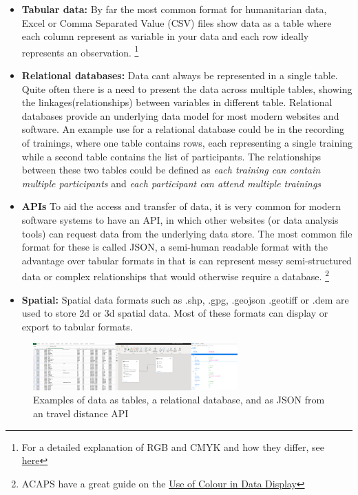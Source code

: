 \documentclass[
  a4paper,
  onecolumn,
  oneside]{book}
\begin{document}
\begin{itemize}
\item
  \textbf{Tabular data:} By far the most common format for humanitarian
  data, Excel or Comma Separated Value (CSV) files show data as a table
  where each column represent as variable in your data and each row
  ideally represents an observation. \footnote{For a detailed
    explanation of RGB and CMYK and how they differ, see
    \href{https://en.99designs.ch/blog/tips/correct-file-formats-rgb-and-cmyk/}{here}}
\item
  \textbf{Relational databases:} Data cant always be represented in a
  single table. Quite often there is a need to present the data across
  multiple tables, showing the linkages(relationships) between variables
  in different table. Relational databases provide an underlying data
  model for most modern websites and software. An example use for a
  relational database could be in the recording of trainings, where one
  table contains rows, each representing a single training while a
  second table contains the list of participants. The relationships
  between these two tables could be defined as \emph{each training can
  contain multiple participants} and \emph{each participant can attend
  multiple trainings}
\item
  \textbf{APIs} To aid the access and transfer of data, it is very
  common for modern software systems to have an API, in which other
  websites (or data analysis tools) can request data from the underlying
  data store. The most common file format for these is called JSON, a
  semi-human readable format with the advantage over tabular formats in
  that is can represent messy semi-structured data or complex
  relationships that would otherwise require a database. \footnote{ACAPS
    have a great guide on the
    \href{https://www.acaps.org/use-colour-data-display}{Use of Colour
    in Data Display}}
\item
  \textbf{Spatial:} Spatial data formats such as .shp, .gpg, .geojson
  .geotiff or .dem are used to store 2d or 3d spatial data. Most of
  these formats can display or export to tabular formats.
\end{itemize}

\begin{figure}

{\centering \includegraphics[width=0.7\textwidth,height=\textheight]{part1/./images/formats.png}

}

\caption{Examples of data as tables, a relational database, and as JSON
from an travel distance API}

\end{figure}
\end{document}
